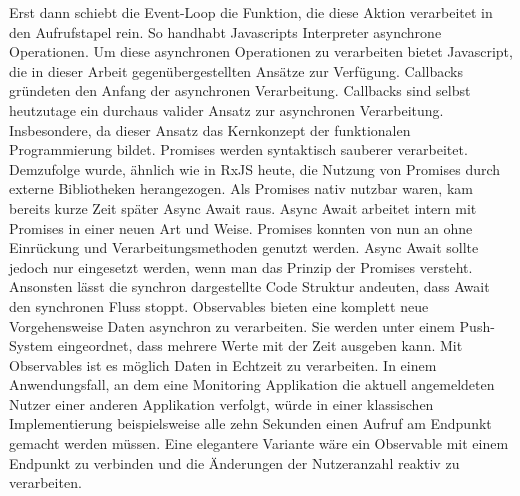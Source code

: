 \noindent
Erst dann schiebt die Event-Loop die Funktion, die diese Aktion verarbeitet in den Aufrufstapel rein. So handhabt Javascripts Interpreter asynchrone Operationen. Um diese asynchronen Operationen zu verarbeiten bietet Javascript, die in dieser Arbeit gegenübergestellten Ansätze zur Verfügung. Callbacks gründeten den Anfang der asynchronen Verarbeitung. Callbacks sind selbst heutzutage ein durchaus valider Ansatz zur asynchronen Verarbeitung. Insbesondere, da dieser Ansatz das Kernkonzept der funktionalen Programmierung bildet. Promises werden syntaktisch \glqq sauberer\grqq{} verarbeitet. Demzufolge wurde, ähnlich wie in RxJS heute, die Nutzung von Promises durch externe Bibliotheken herangezogen. Als Promises nativ nutzbar waren, kam bereits kurze Zeit später Async Await raus. Async Await arbeitet intern mit Promises in einer neuen Art und Weise. Promises konnten von nun an ohne Einrückung und Verarbeitungsmethoden genutzt werden. Async Await sollte jedoch nur eingesetzt werden, wenn man das Prinzip der Promises versteht. Ansonsten lässt die synchron dargestellte Code Struktur andeuten, dass Await den synchronen Fluss stoppt. Observables bieten eine komplett neue Vorgehensweise Daten asynchron zu verarbeiten. Sie werden unter einem Push-System eingeordnet, dass mehrere Werte mit der Zeit ausgeben kann. Mit Observables ist es möglich Daten in Echtzeit zu verarbeiten. In einem Anwendungsfall, an dem eine Monitoring Applikation die aktuell angemeldeten Nutzer einer anderen Applikation verfolgt, würde in einer klassischen Implementierung beispielsweise alle zehn Sekunden einen Aufruf am Endpunkt gemacht werden müssen. Eine elegantere Variante wäre ein Observable mit einem Endpunkt zu verbinden und die Änderungen der Nutzeranzahl reaktiv zu verarbeiten.
